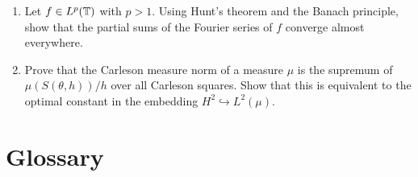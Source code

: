 \begin{enumerate}
    \item [A] Let \(f \in L^p(\mathbb{T})\) with \(p > 1\). Using Hunt's theorem and the Banach principle, show that the partial sums of the Fourier series of \(f\) converge almost everywhere.
    \item [I] Prove that the Carleson measure norm of a measure \(\mu\) is the supremum of \(\mu(S(\theta, h))/h\) over all Carleson squares. Show that this is equivalent to the optimal constant in the embedding \(H^2 \hookrightarrow L^2(\mu)\).
\end{enumerate}

\section*{Glossary}

